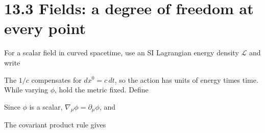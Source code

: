 \documentclass[
  11pt,
  letterpaper,
  oneside,
  openany]{scrbook}
\begin{document}
\hypertarget{fields-a-degree-of-freedom-at-every-point}{%
\section{13.3 Fields: a degree of freedom at every
point}\label{fields-a-degree-of-freedom-at-every-point}}

For a scalar field in curved spacetime, use an SI Lagrangian energy
density \(\mathcal L\) and write

\begin{center}
\begingroup
{}
\ifdim\wd\grmathbox>\linewidth
\resizebox{\linewidth}{!}{\usebox{\grmathbox}}
\else\usebox{\grmathbox}\fi
\endgroup
\end{center}

The \(1/c\) compensates for \(dx^0=c\,dt\), so the action has units of
energy times time. While varying \(\phi\), hold the metric fixed. Define

\begin{center}
\begingroup
{}
\ifdim\wd\grmathbox>\linewidth
\resizebox{\linewidth}{!}{\usebox{\grmathbox}}
\else\usebox{\grmathbox}\fi
\endgroup
\end{center}

Since \(\phi\) is a scalar, \(\nabla_\mu\phi=\partial_\mu\phi\), and

\begin{center}
\begingroup
{}
\ifdim\wd\grmathbox>\linewidth
\resizebox{\linewidth}{!}{\usebox{\grmathbox}}
\else\usebox{\grmathbox}\fi
\endgroup
\end{center}

The covariant product rule gives

\begin{center}
\begingroup
{}
\ifdim\wd\grmathbox>\linewidth
\resizebox{\linewidth}{!}{\usebox{\grmathbox}}
\else\usebox{\grmathbox}\fi
\endgroup
\end{center}
\end{document}
